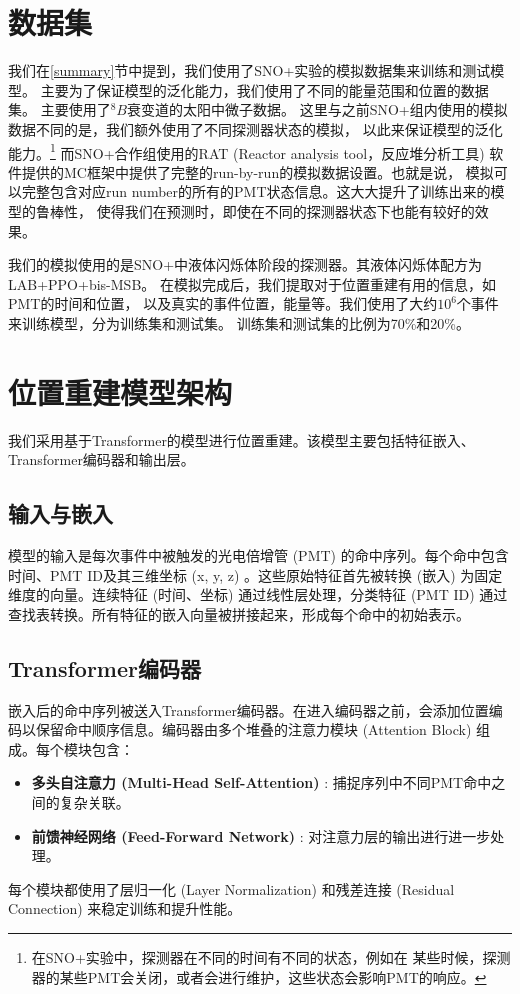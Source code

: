 \section{数据集}\label{dataset}

我们在\ref{summary}节中提到，我们使用了SNO+实验的模拟数据集来训练和测试模型。
主要为了保证模型的泛化能力，我们使用了不同的能量范围和位置的数据集。
主要使用了${}^{8}B$衰变道的太阳中微子数据。
这里与之前SNO+组内使用的模拟数据不同的是，我们额外使用了不同探测器状态的模拟，
以此来保证模型的泛化能力。\footnote{在SNO+实验中，探测器在不同的时间有不同的状态，例如在
某些时候，探测器的某些PMT会关闭，或者会进行维护，这些状态会影响PMT的响应。}
而SNO+合作组使用的RAT (Reactor analysis tool，反应堆分析工具)
软件提供的MC框架中提供了完整的run-by-run的模拟数据设置。也就是说，
模拟可以完整包含对应run number的所有的PMT状态信息。这大大提升了训练出来的模型的鲁棒性，
使得我们在预测时，即使在不同的探测器状态下也能有较好的效果。

我们的模拟使用的是SNO+中液体闪烁体阶段的探测器。其液体闪烁体配方为LAB+PPO+bis-MSB。
在模拟完成后，我们提取对于位置重建有用的信息，如PMT的时间和位置，
以及真实的事件位置，能量等。我们使用了大约$10^6$个事件来训练模型，分为训练集和测试集。
训练集和测试集的比例为70\%和20\%。

\section{位置重建模型架构}\label{model_architecture}

我们采用基于Transformer的模型进行位置重建。该模型主要包括特征嵌入、Transformer编码器和输出层。

\subsection{输入与嵌入}
模型的输入是每次事件中被触发的光电倍增管 (PMT) 的命中序列。每个命中包含时间、PMT ID及其三维坐标 (x, y, z) 。这些原始特征首先被转换 (嵌入) 为固定维度的向量。连续特征 (时间、坐标) 通过线性层处理，分类特征 (PMT ID) 通过查找表转换。所有特征的嵌入向量被拼接起来，形成每个命中的初始表示。

\subsection{Transformer编码器}
嵌入后的命中序列被送入Transformer编码器。在进入编码器之前，会添加位置编码以保留命中顺序信息。编码器由多个堆叠的注意力模块 (Attention Block) 组成。每个模块包含：
\begin{itemize}
    \item \textbf{多头自注意力 (Multi-Head Self-Attention) }: 捕捉序列中不同PMT命中之间的复杂关联。
    \item \textbf{前馈神经网络 (Feed-Forward Network) }: 对注意力层的输出进行进一步处理。
\end{itemize}
每个模块都使用了层归一化 (Layer Normalization) 和残差连接 (Residual Connection) 来稳定训练和提升性能。

